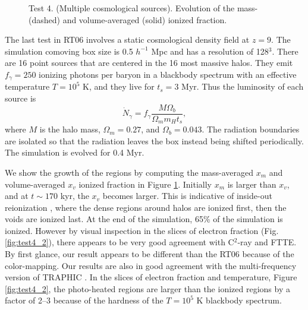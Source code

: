 \documentclass[useAMS,usenatbib]{mn2e}
\begin{document}
\begin{figure}
  \caption{\label{fig:test4_1} Test 4. (Multiple cosmological
    sources).  Evolution of the mass- (dashed) and volume-averaged
    (solid) ionized fraction.}
\end{figure}

\begin{figure*}
  \caption{\label{fig:test4_2} Test 4. (Multiple cosmological
    sources).  Top: Slices through the origin of neutral fraction at
    50 and 200 kyr at the coordinate $z = z_{\rm box}/2$.  Bottom:
    Slices of temperature at 50 and 200 kyr.  No smoothing has been
    applied to the images.}
\end{figure*}

The last test in RT06 involves a static cosmological density field at
$z=9$.  The simulation comoving box size is 0.5 $h^{-1}$ Mpc and has a
resolution of 128$^3$.  There are 16 point sources that are centered
in the 16 most massive halos.  They emit $f_\gamma = 250$ ionizing
photons per baryon in a blackbody spectrum with an effective
temperature $T = 10^5$ K, and they live for $t_s = 3$ Myr.  Thus the
luminosity of each source is
%
\begin{equation}
  \label{eqn:cosmo_lum}
  \dot{N}_\gamma = f_\gamma \frac{M \Omega_b} {\Omega_m m_H t_s},
\end{equation}
where $M$ is the halo mass, $\Omega_m = 0.27$, and $\Omega_b =
0.043$.  The radiation boundaries are isolated so that the radiation
leaves the box instead being shifted periodically.  The simulation is
evolved for 0.4 Myr.

We show the growth of the \hii regions by computing the
mass-averaged $x_m$ and volume-averaged $x_v$ ionized fraction in
Figure \ref{fig:test4_1}.  Initially $x_m$ is larger than $x_v$, and
at $t \sim 170$ kyr, the $x_v$ becomes larger.  This is indicative of
inside-out reionization \citep[e.g.][]{Gnedin00, Miralda00,
  Sokasian03}, where the dense regions around halos are ionized first,
then the voids are ionized last.  At the end of the simulation, 65\%
of the simulation is ionized.  However by visual inspection in the
slices of electron fraction (Fig. \ref{fig:test4_2}), there appears to
be very good agreement with C$^2$-ray and FTTE.  By first glance, our
result appears to be different than the RT06 because of the
color-mapping.  Our results are also in good agreement with the
multi-frequency version of TRAPHIC \citep[][see also for better
representations of the electron fraction slices]{Pawlik10}.  In the
slices of electron fraction and temperature, Figure \ref{fig:test4_2},
the photo-heated regions are larger than the ionized regions by a
factor of 2--3 because of the hardness of the $T = 10^5$ K blackbody
spectrum.
\end{document}
